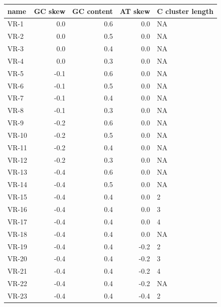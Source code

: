\documentclass[11pt]{article}
\begin{document}
\begin{table}
	\centering
\begin{tabular}{lrrrl}
	\toprule
	name &  GC skew &  GC content &  AT skew & C cluster length \\
	\midrule
	VR-1 &      0.0 &         0.6 &      0.0 &             NA \\
	VR-2 &      0.0 &         0.5 &      0.0 &             NA \\
	VR-3 &      0.0 &         0.4 &      0.0 &             NA \\
	VR-4 &      0.0 &         0.3 &      0.0 &             NA \\
	VR-5 &     -0.1 &         0.6 &      0.0 &             NA \\
	VR-6 &     -0.1 &         0.5 &      0.0 &             NA \\
	VR-7 &     -0.1 &         0.4 &      0.0 &             NA \\
	VR-8 &     -0.1 &         0.3 &      0.0 &             NA \\
	VR-9 &     -0.2 &         0.6 &      0.0 &             NA \\
	VR-10 &     -0.2 &         0.5 &      0.0 &             NA \\
	VR-11 &     -0.2 &         0.4 &      0.0 &             NA \\
	VR-12 &     -0.2 &         0.3 &      0.0 &             NA \\
	VR-13 &     -0.4 &         0.6 &      0.0 &             NA \\
	VR-14 &     -0.4 &         0.5 &      0.0 &             NA \\
	VR-15 &     -0.4 &         0.4 &      0.0 &              2 \\
	VR-16 &     -0.4 &         0.4 &      0.0 &              3 \\
	VR-17 &     -0.4 &         0.4 &      0.0 &              4 \\
	VR-18 &     -0.4 &         0.4 &      0.0 &             NA \\
	VR-19 &     -0.4 &         0.4 &     -0.2 &              2 \\
	VR-20 &     -0.4 &         0.4 &     -0.2 &              3 \\
	VR-21 &     -0.4 &         0.4 &     -0.2 &              4 \\
	VR-22 &     -0.4 &         0.4 &     -0.2 &             NA \\
	VR-23 &     -0.4 &         0.4 &     -0.4 &              2 \\

\end{tabular}
\end{table}
\end{document}
